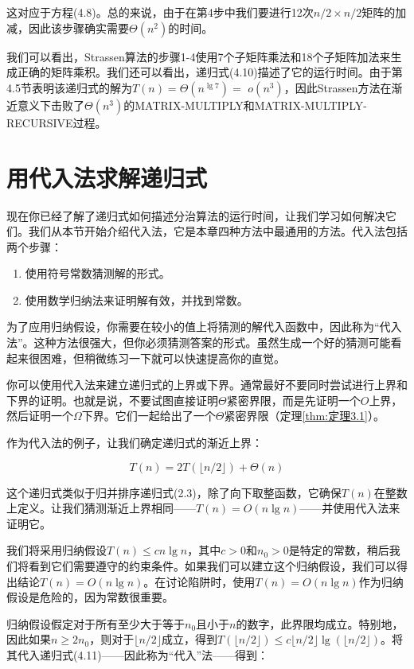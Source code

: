 \documentclass[lang=cn,newtx,10pt,scheme=chinese]{elegantbook}
\begin{document}
这对应于方程(4.8)。总的来说，由于在第4步中我们要进行12次$n/2\times n/2$矩阵的加减，因此该步骤确实需要$\Theta\left(n^2\right)$的时间。

我们可以看出，Strassen算法的步骤1-4使用7个子矩阵乘法和18个子矩阵加法来生成正确的矩阵乘积。我们还可以看出，递归式(4.10)描述了它的运行时间。由于第4.5节表明该递归式的解为$T(n)=\Theta\left(n^{\lg 7}\right)=$ $o\left(n^3\right)$，因此Strassen方法在渐近意义下击败了$\Theta\left(n^3\right)$的MATRIX-MULTIPLY和MATRIX-MULTIPLY-RECURSIVE过程。


\section{用代入法求解递归式}\label{section-4.3}

现在你已经了解了递归式如何描述分治算法的运行时间，让我们学习如何解决它们。我们从本节开始介绍代入法，它是本章四种方法中最通用的方法。代入法包括两个步骤：

\begin{enumerate}
\item 使用符号常数猜测解的形式。
\item 使用数学归纳法来证明解有效，并找到常数。
\end{enumerate}

为了应用归纳假设，你需要在较小的值上将猜测的解代入函数中，因此称为“代入法”。这种方法很强大，但你必须猜测答案的形式。虽然生成一个好的猜测可能看起来很困难，但稍微练习一下就可以快速提高你的直觉。

你可以使用代入法来建立递归式的上界或下界。通常最好不要同时尝试进行上界和下界的证明。也就是说，不要试图直接证明$\Theta$紧密界限，而是先证明一个$O$上界，然后证明一个$\Omega$下界。它们一起给出了一个$\Theta$紧密界限（定理\ref{thm:定理3.1}）。

作为代入法的例子，让我们确定递归式的渐近上界：

\begin{equation}
T(n)=2 T(\lfloor n / 2\rfloor)+\Theta(n)
\end{equation}

这个递归式类似于归并排序递归式(2.3)，除了向下取整函数，它确保$T(n)$在整数上定义。让我们猜测渐近上界相同——$T(n)=O(n \lg n)$——并使用代入法来证明它。

我们将采用归纳假设$T(n) \leq c n \lg n$，其中$c>0$和$n_0>0$是特定的常数，稍后我们将看到它们需要遵守的约束条件。如果我们可以建立这个归纳假设，我们可以得出结论$T(n)=O(n \lg n)$。在讨论陷阱时，使用$T(n)=O(n \lg n)$作为归纳假设是危险的，因为常数很重要。

归纳假设假定对于所有至少大于等于$n_0$且小于$n$的数字，此界限均成立。特别地，因此如果$n \geq 2 n_0$，则对于$\lfloor n / 2\rfloor$成立，得到$T(\lfloor n / 2\rfloor) \leq c\lfloor n / 2\rfloor \lg (\lfloor n / 2\rfloor)$。将其代入递归式(4.11)——因此称为“代入”法——得到：
\end{document}
